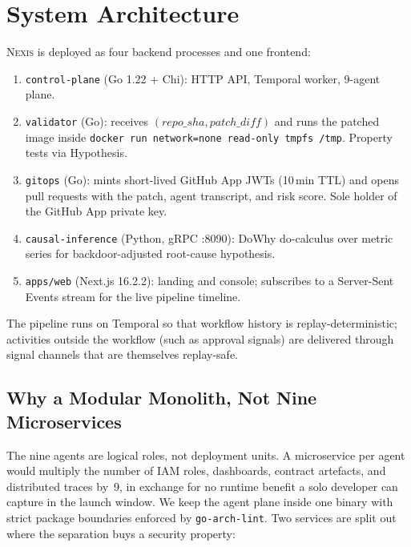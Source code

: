 \documentclass[manuscript,nonacm=true,screen=false,review=false]{acmart}
\begin{document}
\section{System Architecture}\label{sec:arch}

\textsc{Nexis} is deployed as four backend processes and one frontend:

\begin{enumerate}
\item \texttt{control-plane} (Go 1.22 + Chi): HTTP API, Temporal worker, 9-agent plane.
\item \texttt{validator} (Go): receives \((repo\_sha, patch\_diff)\) and runs the patched image inside \texttt{docker run \-\-network=none \-\-read-only \-\-tmpfs /tmp}. Property tests via Hypothesis.
\item \texttt{gitops} (Go): mints short-lived GitHub App JWTs (10\,min TTL) and opens pull requests with the patch, agent transcript, and risk score. Sole holder of the GitHub App private key.
\item \texttt{causal-inference} (Python, gRPC :8090): DoWhy do-calculus over metric series for backdoor-adjusted root-cause hypothesis.
\item \texttt{apps/web} (Next.js 16.2.2): landing and console; subscribes to a Server-Sent Events stream for the live pipeline timeline.
\end{enumerate}

The pipeline runs on Temporal so that workflow history is replay-deterministic; activities outside the workflow (such as approval signals) are delivered through signal channels that are themselves replay-safe.

\subsection{Why a Modular Monolith, Not Nine Microservices}

The nine agents are logical roles, not deployment units. A microservice per agent would multiply the number of IAM roles, dashboards, contract artefacts, and distributed traces by~9, in exchange for no runtime benefit a solo developer can capture in the launch window. We keep the agent plane inside one binary with strict package boundaries enforced by \texttt{go-arch-lint}. Two services are split out where the separation buys a security property:
\end{document}
